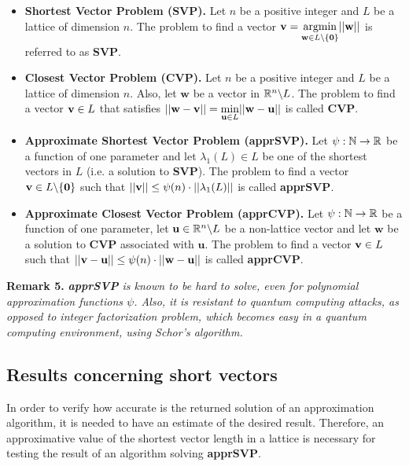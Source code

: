 \begin{itemize}
	\item  \textbf{Shortest Vector Problem (SVP).} Let $n$ be a positive integer and $L$ be a lattice of dimension $n$. The problem to find a vector $\textbf{v} = \displaystyle{\operatorname*{argmin}_{ \textbf{w} \in L \backslash \{\textbf{0}\}}} ||\textbf{w}||$ is referred to as \textbf{SVP}.\\
	
	\item \textbf{Closest Vector Problem (CVP).} Let $n$ be a positive integer and $L$ be a lattice of dimension $n$. Also, let $\textbf{w}$ be a vector in $\mathbb{R}^n \backslash L$. The problem to find a vector $\textbf{v}\in L$ that satisfies $||\textbf{w} - \textbf{v}|| = \displaystyle{\min_{ \textbf{u} \in L}} ||\textbf{w} - \textbf{u} || $ is called \textbf{CVP}.\\
	
	\item \textbf{Approximate Shortest Vector Problem (apprSVP).} Let $\psi : {\mathbb N} \rightarrow \mathbb{R}$ be a function of one parameter and let $\lambda_1(L) \in L$ be one of the shortest vectors in $L$ (i.e. a solution to \textbf{SVP}). The problem to find a vector $\textbf{v} \in L \backslash \{\textbf{0}\}$ such that $||\textbf{v}|| \leq \psi(n) \cdot || \lambda_1(L) ||$ is called \textbf{apprSVP}.\\

	\item \textbf{Approximate Closest Vector Problem (apprCVP).} Let $\psi : {\mathbb N} \rightarrow \mathbb{R}$ be a function of one parameter, let $\textbf{u} \in \mathbb{R}^n \backslash L$ be a non-lattice vector and let $\textbf{w}$ be a solution to \textbf{CVP} associated with $\textbf{u}$. The problem to find a vector $\textbf{v} \in L$ such that $||\textbf{v} - \textbf{u} || \leq \psi(n) \cdot ||\textbf{w} - \textbf{u}||$ is called \textbf{apprCVP}.
\end{itemize}

\textbf{Remark 5. } \textit{\textbf{apprSVP} is known to be hard to solve, even for polynomial approximation functions $\psi$. Also, it is resistant to quantum computing attacks, as opposed to integer factorization problem, which becomes easy in a quantum computing environment, using Schor's algorithm.}

\subsection{Results concerning short vectors}

In order to verify how accurate is the returned solution of an approximation algorithm, it is needed to have an estimate of the desired result. Therefore, an approximative value of the shortest vector length in a lattice is necessary for testing the result of an algorithm solving \textbf{apprSVP}. \\

